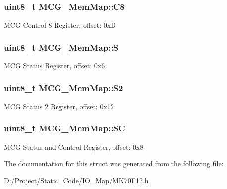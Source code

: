 \subsubsection[{C8}]{\setlength{\rightskip}{0pt plus 5cm}uint8\+\_\+t M\+C\+G\+\_\+\+Mem\+Map\+::\+C8}\label{struct_m_c_g___mem_map_a346a8b8c5c2c675e6297aaa1f14798df}
M\+C\+G Control 8 Register, offset\+: 0x\+D \hypertarget{struct_m_c_g___mem_map_a65ee0333e0d5c462c7dd8c2402bf93be}{}
\subsubsection[{S}]{\setlength{\rightskip}{0pt plus 5cm}uint8\+\_\+t M\+C\+G\+\_\+\+Mem\+Map\+::\+S}\label{struct_m_c_g___mem_map_a65ee0333e0d5c462c7dd8c2402bf93be}
M\+C\+G Status Register, offset\+: 0x6 \hypertarget{struct_m_c_g___mem_map_a97d548f46a8b3fa3cd094dbbd5e579af}{}
\subsubsection[{S2}]{\setlength{\rightskip}{0pt plus 5cm}uint8\+\_\+t M\+C\+G\+\_\+\+Mem\+Map\+::\+S2}\label{struct_m_c_g___mem_map_a97d548f46a8b3fa3cd094dbbd5e579af}
M\+C\+G Status 2 Register, offset\+: 0x12 \hypertarget{struct_m_c_g___mem_map_aeff584aa52340d7c66dc06789ad05310}{}
\subsubsection[{S\+C}]{\setlength{\rightskip}{0pt plus 5cm}uint8\+\_\+t M\+C\+G\+\_\+\+Mem\+Map\+::\+S\+C}\label{struct_m_c_g___mem_map_aeff584aa52340d7c66dc06789ad05310}
M\+C\+G Status and Control Register, offset\+: 0x8 

The documentation for this struct was generated from the following file\+:\begin{DoxyCompactItemize}
\item 
D\+:/\+Project/\+Static\+\_\+\+Code/\+I\+O\+\_\+\+Map/\hyperlink{_m_k70_f12_8h}{M\+K70\+F12.\+h}\end{DoxyCompactItemize}
